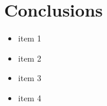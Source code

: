 \newpage
\chapter*{Conclusions}

\begin{itemize}
  \item item 1
  \item item 2
  \item item 3
  \item item 4
\end{itemize}
